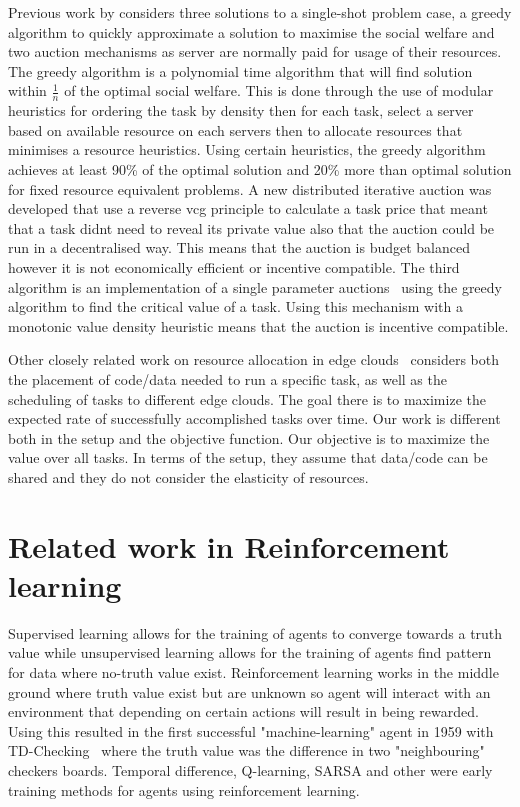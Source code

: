 Previous work by \cite{FlexibleResourceAllocation} considers three solutions to a single-shot problem case,
a greedy algorithm to quickly approximate a solution to maximise the social welfare and two auction mechanisms as server
are normally paid for usage of their resources. The greedy algorithm is a polynomial time algorithm that will find solution
within $\frac{1}{n}$ of the optimal social welfare.
This is done through the use of modular heuristics for ordering the task by density then for each task, select a server
based on available resource on each servers then to allocate resources that minimises a resource heuristics.
Using certain heuristics, the greedy algorithm achieves at least 90\% of the optimal solution and 20\% more than optimal
solution for fixed resource equivalent problems. A new distributed iterative auction was developed that use a reverse vcg
principle to calculate a task price that meant that a task didnt need to reveal its private value also that the
auction could be run in a decentralised way. This means that the auction is budget balanced however it is not
economically efficient or incentive compatible. The third algorithm is an implementation of a single parameter
auctions~\citep{nisan2007algorithmic_critical_value} using the greedy algorithm to find the critical value of a task.
Using this mechanism with a monotonic value density heuristic means that the auction is incentive compatible.

Other closely related work on resource allocation in edge clouds~\cite{vaji_infocom} considers both the placement of
code/data needed to run a specific task, as well as the scheduling of tasks to different edge clouds. The goal there
is to maximize the expected rate of successfully accomplished tasks over time. Our work is different both in the setup
and the objective function. Our objective is to maximize the value over all tasks. In terms of the setup, they assume
that data/code can be shared and they do not consider the elasticity of resources.

\section{Related work in Reinforcement learning}\label{sec:related-work-reinforcement-learning}
Supervised learning allows for the training of agents to converge towards a truth value while unsupervised learning
allows for the training of agents find pattern for data where no-truth value exist. Reinforcement learning works in the
middle ground where truth value exist but are unknown so agent will interact with an environment that depending on certain
actions will result in being rewarded. Using this resulted in the first successful "machine-learning" agent in 1959 with
TD-Checking~\citep{samuel1988some} where the truth value was the difference in two "neighbouring" checkers boards. Temporal difference,
Q-learning, SARSA and other were early training methods for agents using reinforcement learning.

